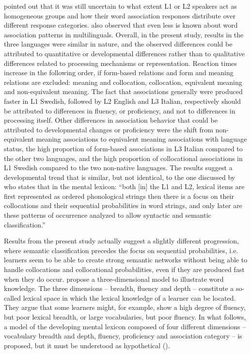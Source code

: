 \documentclass[output=paper,colorlinks,citecolor=brown,nonflat]{langsci/langscibook}
\begin{document}
\citet{CremerEtAl2010} pointed out that it was still uncertain to what extent L1 or L2 speakers act as homogeneous groups and how their word association responses distribute over different response categories. \citeauthor{CremerEtAl2010} also observed that even less is known about word association patterns in multilinguals. Overall, in the present study, results in the three languages were similar in nature, and the observed differences could be attributed to quantitative or developmental differences rather than to qualitative differences related to processing mechanisms or representation. Reaction times increase in the following order, if form-based relations and form and meaning relations are excluded: meaning and collocation, collocation, equivalent meaning and non-equivalent meaning. The fact that associations generally were produced faster in L1 Swedish, followed by L2 English and L3 Italian, respectively should be attributed to differences in fluency, or proficiency, and not to differences in processing itself. Other differences in association behavior that could be attributed to developmental changes or proficiency were the shift from non-equivalent meaning associations to equivalent meaning associations with language status, the high proportion of form-based associations in L3 Italian compared to the other two languages, and the high proportion of collocational associations in L1 Swedish compared to the two non-native languages. The results suggest a developmental trend that is similar, but not identical, to the one discussed by \citet[94]{EllisN1996} who states that in the mental lexicon: “both [in] the L1 and L2, lexical items are first represented as ordered phonological strings then there is a focus on their collocations and their sequential probabilities in word strings, and only later are these patterns of occurrence analyzed to allow syntactic and semantic classification.”

Results from the present study actually suggest a slightly different progression, where semantic classification precedes the focus on sequential probabilities, i.e. learners seem to be able to create strong semantic networks without being able to handle collocations and collocational probabilities, even if they are produced fast when they do occur. \citet{DallerEtAl2007} propose a three-dimensional model to illustrate word knowledge. The three dimensions – breadth, fluency and depth – constitute a so-called lexical space in which the lexical knowledge of a learner can be located. They argue that some learners might, for example, show a high degree of fluency, but poor lexical breadth, or large vocabularies, but poor fluency. In what follows, a model of the developing mental lexicon composed of four different dimensions – vocabulary breadth and depth, fluency, proficiency and association category – is proposed, but it must be understood as hypothetical ().
\end{document}
